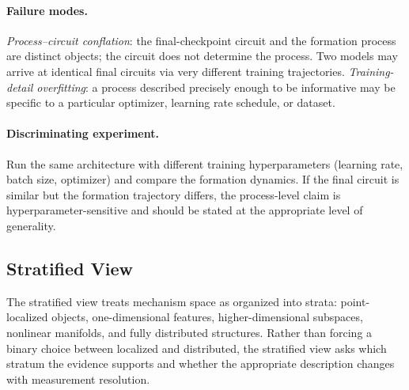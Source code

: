\documentclass[11pt]{article}
\theoremstyle{remark}
\begin{document}
\paragraph{Failure modes.}
\emph{Process--circuit conflation}: the final-checkpoint circuit and the
formation process are distinct objects; the circuit does not determine
the process.  Two models may arrive at identical final circuits via very
different training trajectories.  \emph{Training-detail overfitting}: a
process described precisely enough to be informative may be specific to
a particular optimizer, learning rate schedule, or dataset.

\paragraph{Discriminating experiment.}
Run the same architecture with different training hyperparameters (learning
rate, batch size, optimizer) and compare the formation dynamics.  If the
final circuit is similar but the formation trajectory differs, the
process-level claim is hyperparameter-sensitive and should be stated at
the appropriate level of generality.

\subsection{Stratified View}

The stratified view treats mechanism space as organized into strata:
point-localized objects, one-dimensional features, higher-dimensional
subspaces, nonlinear manifolds, and fully distributed structures.  Rather
than forcing a binary choice between localized and distributed, the
stratified view asks which stratum the evidence supports and whether the
appropriate description changes with measurement resolution.
\end{document}
